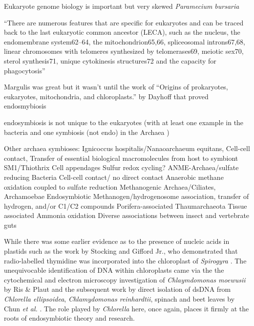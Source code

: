 Eukaryote genome biology is important but very skewed \citep{DelCampo2014}
\textit{Paramecium bursaria} 


``There are numerous features that are specific for eukaryotes and can be traced back to the last 
eukaryotic common ancestor (LECA), such as the nucleus, the endomembrane system62–64, the 
mitochondrion65,66, spliceosomal introns67,68, linear chromosomes with telomeres synthesized by 
telomerases69, meiotic sex70, sterol synthesis71, unique cytokinesis structures72 and the capacity 
for phagocytosis'' \citep{Gribaldo2010}



Margulis was great but it wasn't until the work of ``Origins of prokaryotes, eukaryotes, mitochondria, and chloroplasts.'' by Dayhoff that proved endosmybiosis \citep{Schwartz1976}




endosymbiosis is not unique to the eukaryotes (with at least one example in the
bacteria \citep{vonDohlen2001} and one symbiosis (not endo) in the Archaea \citep{Huber2002})


Other archaea symbioses:
Ignicoccus hospitalis/Nanaoarchaeum equitans, Cell-cell contact, Transfer of essential biological macromolecules from host to symbiont
SM1/Thiothrix   Cell appendages Sulfur redox cycling?
ANME-Archaea/sulfate reducing Bacteria  Cell-cell contact/ no direct contact    Anaerobic methane oxidation coupled to sulfate reduction
Methanogenic Archaea/Ciliates, Archamoebae   Endosymbiotic   Methanogen/hydrogenosome association, transfer of hydrogen, and/or C1/C2 compounds
Porifera-associated Thaumarchaeota  Tissue associated   Ammonia oxidation
Diverse associations between insect and vertebrate guts
\citep{Wrede2012}




While there was some earlier evidence as to the presence of nucleic acids in 
plastids such as the work by Stocking and Gifford Jr., who demonstrated that
radio-labelled thymidine was incorporated into the chloroplast of \textit{Spirogyra}
\citep{Stocking1959}.
The unequivocable identification of DNA within chloroplasts came via the 
the cytochemical and electron microscopy investigation of \textit{Chlaymdomonas moewusii} 
by Ris \& Plaut \citep{Ris1962} and the subsequent work by direct isolation of
dsDNA from \textit{Chlorella ellipsoidea}, \textit{Chlamydomonas reinhardtii}, spinach
and beet leaves by Chun \textit{et al.} \citep{Chun1963}. The role played by
\textit{Chlorella} here, once again, places it firmly at the roots of endosymbiotic
theory and research.



